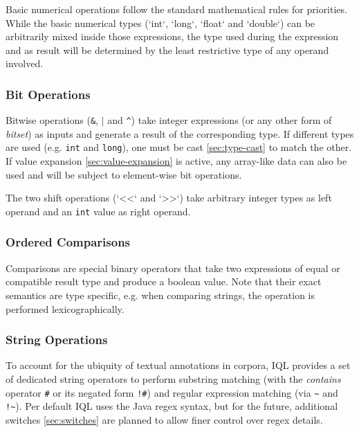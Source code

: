 \documentclass[11pt]{article}
\begin{document}
Basic numerical operations follow the standard mathematical rules for priorities.
While the basic numerical types (`int`, `long`, `float` and `double`) can be arbitrarily mixed inside those expressions, the type used during the expression and as result will be determined by the least restrictive type of any operand involved.

\subsubsection{Bit Operations}
\label{sec:bit-operations}

Bitwise operations (\texttt{\&}, \texttt{$|$} and \texttt{\textasciicircum}) take integer expressions (or any other form of \textit{bitset}) as inputs and generate a result of the corresponding type. If different types are used (e.g. \texttt{int} and \texttt{long}), one must be cast \cref{sec:type-cast} to match the other. If value expansion \cref{sec:value-expansion} is active, any array-like data can also be used and will be subject to element-wise bit operations.

The two shift operations (`<<` and `>>`) take arbitrary integer types as left operand and an \texttt{int} value as right operand.

\subsubsection{Ordered Comparisons}
\label{sec:ordered-comparisons}

Comparisons are special binary operators that take two expressions of equal or compatible result type and produce a boolean value. Note that their exact semantics are type specific, e.g. when comparing strings, the operation is performed lexicographically.

\subsubsection{String Operations}
\label{sec:string-operations}

To account for the ubiquity of textual annotations in corpora, IQL provides a set of dedicated string operators to perform substring matching (with the \textit{contains} operator \texttt{\#} or its negated form \texttt{!\#}) and regular expression matching (via \texttt{\textasciitilde} and \texttt{!\textasciitilde}). Per default IQL uses the Java regex syntax, but for the future, additional switches \cref{sec:switches} are planned to allow finer control over regex details.
\end{document}
